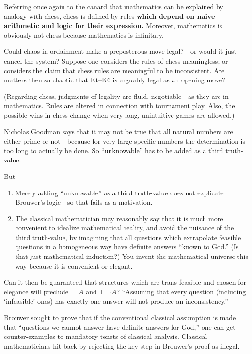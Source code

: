 Referring once again to the canard that mathematics can be explained by analogy with chess, chess is defined by rules \textbf{which depend on naive arithmetic and logic for their expression.} Moreover, mathematics is obviously not chess because mathematics is infinitary.

Could chaos in ordainment make a preposterous move legal?---or would it just cancel the system? Suppose one considers the rules of chess meaningless; or considers the claim that chess rules are meaningful to be inconsistent. Are matters then so chaotic that Kt--K6 is arguably legal as an opening move?

(Regarding chess, judgments of legality are fluid, negotiable---as they are in mathematics. Rules are altered in connection with tournament play. Also, the possible wins in chess change when very long, unintuitive games are allowed.)

\jarule

Nicholas Goodman says that it may not be true that all natural numbers are either prime or not---because for very large specific numbers the determination is too long to actually be done. So \enquote{unknowable} has to be added as a third truth-value.

But:
\begin{enumerate}[label=\arabic*), itemsep=1ex]
\item Merely adding \enquote{unknowable} as a third truth-value does not explicate Brouwer's logic---so that fails as a motivation.
\item The classical mathematician may reasonably say that it is much more convenient to idealize mathematical reality, and avoid the nuisance of the third truth-value, by imagining that all questions which extrapolate feasible questions in a homogeneous way have definite answers \enquote{known to God.} (Is that just mathematical induction?) You invent the mathematical universe this way because it is convenient or elegant.
\end{enumerate}

Can it then be guaranteed that structures which are trans-feasible and chosen for elegance will preclude $\vdash A$ and $\vdash\lnot A$? \enquote{Assuming that every question (including \enquote{infeasible} ones) has exactly one answer will not produce an inconsistency.}

Brouwer sought to prove that if the conventional classical assumption is made that \enquote{questions we cannot answer have definite answers for God,} one can get counter-examples to mandatory tenets of classical analysis. Classical mathematicians hit back by rejecting the key step in Brouwer's proof as illegal.

